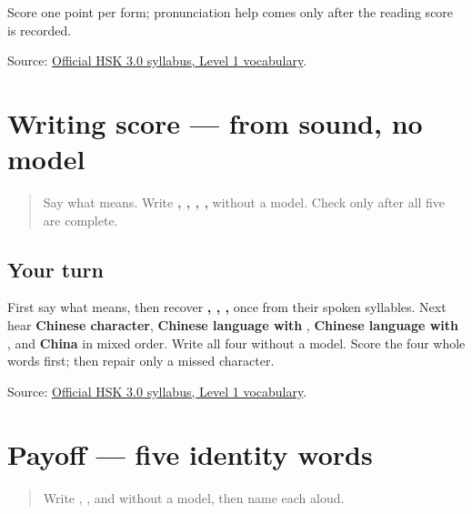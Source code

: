 Score one point per form; pronunciation help comes only after the reading score is recorded.

\begin{tcolorbox}[breakable,colback=teal!4,colframe=teal!35!black,title={Before you move on}]
Source: \href{https://hsk.cn-bj.ufileos.com/3.0/\%E6\%96\%B0\%E7\%89\%88HSK\%E8\%80\%83\%E8\%AF\%95\%E5\%A4\%A7\%E7\%BA\%B21219.pdf}{Official HSK 3.0 syllabus, Level 1 vocabulary}.
\end{tcolorbox}
\section[\texorpdfstring{\zh{字} — \zh{汉字} — \zh{汉语} … (zì — hànzì …)}{字 — 汉字 — 汉语 … (zì — hànzì …)}]{Writing score — from sound, no model}

\label{lesson:ZH-R17-writing-five}



\begin{quote}
Say what  means. Write \textbf{, , , , } without a model. Check only after all five are complete.
\end{quote}

\subsection*{Your turn}
First say what  means, then recover \textbf{, , , } once from their spoken syllables. Next hear \textbf{Chinese character}, \textbf{Chinese language with }, \textbf{Chinese language with }, and \textbf{China} in mixed order. Write all four without a model. Score the four whole words first; then repair only a missed character.

\begin{tcolorbox}[breakable,colback=teal!4,colframe=teal!35!black,title={Before you move on}]
Source: \href{https://hsk.cn-bj.ufileos.com/3.0/\%E6\%96\%B0\%E7\%89\%88HSK\%E8\%80\%83\%E8\%AF\%95\%E5\%A4\%A7\%E7\%BA\%B21219.pdf}{Official HSK 3.0 syllabus, Level 1 vocabulary}.
\end{tcolorbox}
\section[Practice]{Payoff — five identity words}

\label{lesson:ZH-C17-practice}



\begin{quote}
Write , , and  without a model, then name each aloud.
\end{quote}

